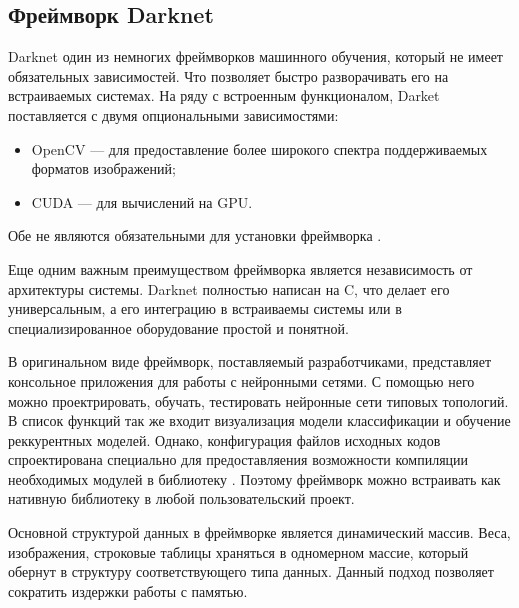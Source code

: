 \documentclass[a4paper,english,russian]{G2-105}
\begin{document}
\subsection{Фреймворк Darknet}
\par Darknet один из немногих фреймворков машинного обучения, который не имеет обязательных зависимостей. Что позволяет быстро разворачивать его на встраиваемых системах. На ряду с встроенным функционалом, Darket поставляется с двумя опциональными зависимостями:
\begin{itemize}
\item OpenCV --- для предоставление более широкого спектра поддерживаемых форматов изображений;
\item CUDA --- для вычислений на GPU. 
\end{itemize}
\par Обе не являются обязательными для установки фреймворка \cite{14}.
\par Еще одним важным преимуществом фреймворка является независимость от архитектуры системы. Darknet полностью написан на C, что делает его универсальным, а его интеграцию в встраиваемы системы или в специализированное оборудование простой и понятной. 
\par В оригинальном виде фреймворк, поставляемый разработчиками, представляет консольное приложения для работы с нейронными сетями. С помощью него можно проектрировать, обучать, тестировать нейронные сети типовых топологий. В список функций так же входит визуализация модели классификации и обучение реккурентных моделей. Однако, конфигурация файлов исходных кодов спроектирована специально для предоставляения возможности компиляции необходимых модулей в библиотеку \cite{15}. Поэтому фреймворк можно встраивать как нативную библиотеку в любой пользовательский проект.
\par Основной структурой данных в фреймворке является динамический массив. Веса, изображения, строковые таблицы храняться в одномерном массие, который обернут в структуру соответствующего типа данных. Данный подход позволяет сократить издержки работы с памятью.
\end{document}

